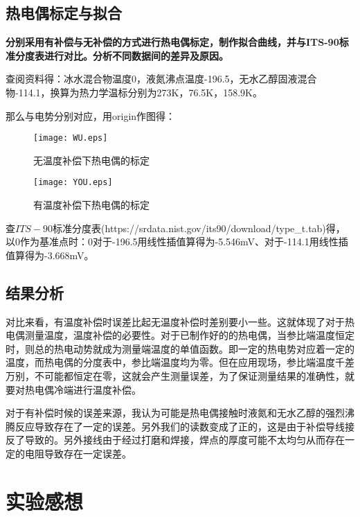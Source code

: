 \documentclass[UTF8,a4paper,10pt]{ctexart}
\begin{document}
	\subsection{热电偶标定与拟合}
	\textbf{分别采用有补偿与无补偿的方式进行热电偶标定，制作拟合曲线，并与ITS-90标准分度表进行对比。分析不同数据间的差异及原因。}
	
	查阅资料得：冰水混合物温度0\textcelsius，液氮沸点温度-196.5\textcelsius，无水乙醇固液混合物-114.1\textcelsius，换算为热力学温标分别为273K，76.5K，158.9K。
	
	那么与电势分别对应，用origin作图得：
	
	\begin{figure}[h]
		\centering
		\texttt{[image: WU.eps]}
		\caption{无温度补偿下热电偶的标定}
	\end{figure}

	\begin{figure}[h]
		\centering
		\texttt{[image: YOU.eps]}
		\caption{有温度补偿下热电偶的标定}
	\end{figure}
	
	查$ITS-90$标准分度表(https://srdata.nist.gov/its90/download/type\_t.tab)得，以0\textcelsius 作为基准点时：0\textcelsius 对于-196.5\textcelsius 用线性插值算得为-5.546mV、对于-114.1\textcelsius 用线性插值算得为-3.668mV。
	\subsection{结果分析}
	对比来看，有温度补偿时误差比起无温度补偿时差别要小一些。这就体现了对于热电偶测量温度，温度补偿的必要性。对于已制作好的的热电偶，当参比端温度恒定时，则总的热电动势就成为测量端温度的单值函数。即一定的热电势对应着一定的温度，而热电偶的分度表中，参比端温度均为零。但在应用现场，参比端温度千差万别，不可能都恒定在零，这就会产生测量误差，为了保证测量结果的准确性，就要对热电偶冷端进行温度补偿。
	
	对于有补偿时候的误差来源，我认为可能是热电偶接触时液氮和无水乙醇的强烈沸腾反应导致存在了一定的误差。另外我们的读数变成了正的，这是由于补偿导线接反了导致的。另外接线由于经过打磨和焊接，焊点的厚度可能不太均匀从而存在一定的电阻导致存在一定误差。
	\section{实验感想}
	
\end{document}

